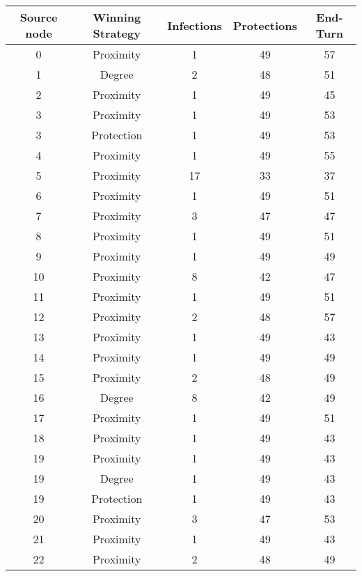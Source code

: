 \documentclass[results.tex]{subfiles}
\begin{document}
\begin{center}
  \begin{tabular}{| c || c | c | c | c |}
    \hline
    {\bfseries Source node} & {\bfseries Winning Strategy} & {\bfseries Infections} & {\bfseries Protections} & {\bfseries End-Turn} \\  %
    \hline\hline
    0 & Proximity & 1 & 49 & 57 \\ 
    \hline
    1 & Degree & 2 & 48 & 51 \\ 
    \hline
    2 & Proximity & 1 & 49 & 45 \\ 
    \hline
    3 & Proximity & 1 & 49 & 53 \\ 
    \hline
    3 & Protection & 1 & 49 & 53 \\ 
    \hline
    4 & Proximity & 1 & 49 & 55 \\ 
    \hline
    5 & Proximity & 17 & 33 & 37 \\ 
    \hline
    6 & Proximity & 1 & 49 & 51 \\ 
    \hline
    7 & Proximity & 3 & 47 & 47 \\ 
    \hline
    8 & Proximity & 1 & 49 & 51 \\ 
    \hline
    9 & Proximity & 1 & 49 & 49 \\ 
    \hline
    10 & Proximity & 8 & 42 & 47 \\ 
    \hline
    11 & Proximity & 1 & 49 & 51 \\ 
    \hline
    12 & Proximity & 2 & 48 & 57 \\ 
    \hline
    13 & Proximity & 1 & 49 & 43 \\ 
    \hline
    14 & Proximity & 1 & 49 & 49 \\ 
    \hline
    15 & Proximity & 2 & 48 & 49 \\ 
    \hline
    16 & Degree & 8 & 42 & 49 \\ 
    \hline
    17 & Proximity & 1 & 49 & 51 \\ 
    \hline
    18 & Proximity & 1 & 49 & 43 \\ 
    \hline
    19 & Proximity & 1 & 49 & 43 \\ 
    \hline
    19 & Degree & 1 & 49 & 43 \\ 
    \hline
    19 & Protection & 1 & 49 & 43 \\ 
    \hline
    20 & Proximity & 3 & 47 & 53 \\ 
    \hline
    21 & Proximity & 1 & 49 & 43 \\ 
    \hline
    22 & Proximity & 2 & 48 & 49 \\ 

\end{tabular}
\end{center}
\end{document}
